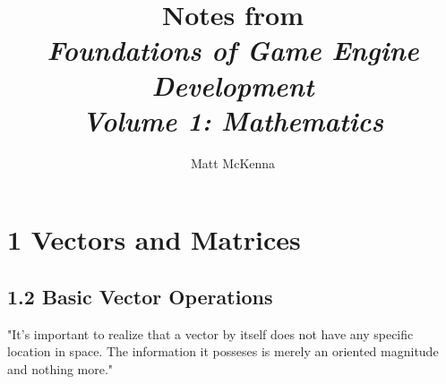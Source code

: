 \documentclass[11pt]{article}
\title{Notes from\\\textit{Foundations of Game Engine Development\\Volume 1: Mathematics}}
\author{Matt McKenna}
\begin{document}
\begin{titlepage}
\clearpage\maketitle
\thispagestyle{empty}
\end{titlepage}
\section*{1 Vectors and Matrices}
\subsection*{1.2 Basic Vector Operations}

"It's important to realize that a vector by itself does not have any specific location in space.
The information it posseses is merely an oriented magnitude and nothing more."
\end{document}

